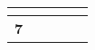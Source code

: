 \documentclass[12pt,a4paper,twoside]{article}
\begin{document}
\begin{longtable}{|>{\centering\arraybackslash}m{10cm}|>{\centering\arraybackslash}m{1.5cm}|>{\centering\arraybackslash}m{1.5cm}|>{\centering\arraybackslash}m{1.5cm}|>{\centering\arraybackslash}m{1.5cm}|}
                            
                                 & \textbf{}
                            

                        
                    
                        
                            

                            
                                 & \textbf{}
                            

                        
                    
                        
                            

                            
                                 & \textbf{}
                            

                        
                    
                        
                            

                            
                                 & \textbf{}
                            

                        
                    
                    \\ \hline
                
                    \cellcolor{gray!20} \textbf{ 7 }
                     
                        
                            

                            
                                 & \textbf{}
                            

                        
                    
                        
                            

                            
                                 & \textbf{}
                            

                        
                    
                        
                            

                            
                                 & \textbf{}
                            


\end{longtable}
\end{document}

